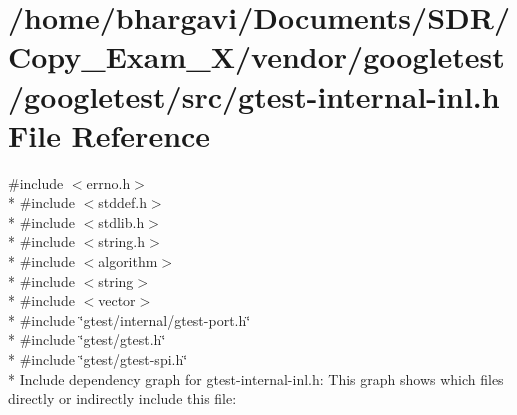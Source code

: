 \hypertarget{gtest-internal-inl_8h}{}\section{/home/bhargavi/\+Documents/\+S\+D\+R/\+Copy\+\_\+\+Exam\+\_\+X/vendor/googletest/googletest/src/gtest-\/internal-\/inl.h File Reference}
\label{gtest-internal-inl_8h}
{\ttfamily \#include $<$errno.\+h$>$}\\*
{\ttfamily \#include $<$stddef.\+h$>$}\\*
{\ttfamily \#include $<$stdlib.\+h$>$}\\*
{\ttfamily \#include $<$string.\+h$>$}\\*
{\ttfamily \#include $<$algorithm$>$}\\*
{\ttfamily \#include $<$string$>$}\\*
{\ttfamily \#include $<$vector$>$}\\*
{\ttfamily \#include \char`\"{}gtest/internal/gtest-\/port.\+h\char`\"{}}\\*
{\ttfamily \#include \char`\"{}gtest/gtest.\+h\char`\"{}}\\*
{\ttfamily \#include \char`\"{}gtest/gtest-\/spi.\+h\char`\"{}}\\*
Include dependency graph for gtest-\/internal-\/inl.h\+:
This graph shows which files directly or indirectly include this file\+:
